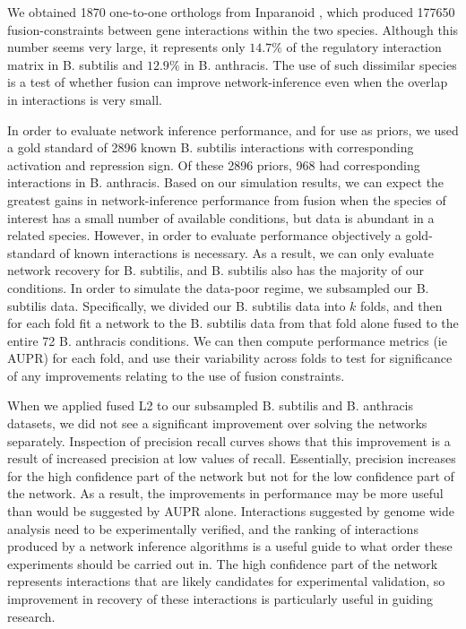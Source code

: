 \documentclass[11pt]{article}
\begin{document}
We obtained 1870 one-to-one orthologs from Inparanoid \cite{ostlund_inparanoid_2010}, which produced 177650 fusion-constraints between gene interactions within the two species. Although this number seems very large, it represents only $14.7\%$ of the regulatory interaction matrix in B. subtilis and $12.9\%$ in B. anthracis. The use of such dissimilar species is a test of whether fusion can improve network-inference even when the overlap in interactions is very small. 

In order to evaluate network inference performance, and for use as priors, we used a gold standard of 2896 known B. subtilis interactions with corresponding activation and repression sign. Of these 2896 priors, 968 had corresponding interactions in B. anthracis. Based on our simulation results, we can expect the greatest gains in network-inference performance from fusion when the species of interest has a small number of available conditions, but data is abundant in a related species. However, in order to evaluate performance objectively a gold-standard of known interactions is necessary. As a result, we can only evaluate network recovery for B. subtilis, and B. subtilis also has the majority of our conditions. In order to simulate the data-poor regime, we subsampled our B. subtilis data. Specifically, we divided our B. subtilis data into $k$ folds, and then for each fold fit a network to the B. subtilis data from that fold alone fused to the entire 72 B. anthracis conditions. We can then compute performance metrics (ie AUPR) for each fold, and use their variability across folds to test for significance of any improvements relating to the use of fusion constraints. 

When we applied fused L2 to our subsampled B. subtilis and B. anthracis datasets, we did not see a significant improvement over solving the networks separately. Inspection of precision recall curves shows that this improvement is a result of increased precision at low values of recall. Essentially, precision increases for the high confidence part of the network but not for the low confidence part of the network. As a result, the improvements in performance may be more useful than would be suggested by AUPR alone. Interactions suggested by genome wide analysis need to be experimentally verified, and the ranking of interactions produced by a network inference algorithms is a useful guide to what order these experiments should be carried out in. The high confidence part of the network represents interactions that are likely candidates for experimental validation, so improvement in recovery of these interactions is particularly useful in guiding research. 
\end{document}
